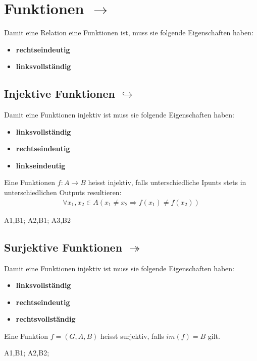 \section{Funktionen $\rightarrow$}
Damit eine Relation eine Funktionen ist, muss sie folgende Eigenschaften haben:
\begin{itemize}
    \item \textbf{rechtseindeutig}
    \item \textbf{linksvollständig}
\end{itemize}
\subsection{Injektive Funktionen $\hookrightarrow$}
Damit eine Funktionen injektiv ist muss sie folgende Eigenschaften haben:
\begin{itemize}
    \item \textbf{linksvollständig}
    \item \textbf{rechtseindeutig}
    \item \textbf{linkseindeutig}
\end{itemize}
Eine Funktionen $f : A \rightarrow B$ heisst injektiv, falls unterschiedliche Ipunts stets in
unterschiedlichen Outputs resultieren:
\begin{align*}
    \forall{x_1, x_2} \in A(x_1 \neq x_2 \Rightarrow f(x_1) \neq f(x_2))
\end{align*}
\begin{center}
        {
        A1,B1;
        A2,B1;
        A3,B2
        }
    \injektiv{}
\end{center}
\subsection{Surjektive Funktionen $\twoheadrightarrow$}
Damit eine Funktionen injektiv ist muss sie folgende Eigenschaften haben:
\begin{itemize}
    \item \textbf{linksvollständig}
    \item \textbf{rechtseindeutig}
    \item \textbf{rechtsvollständig}
\end{itemize}
Eine Funktion $f = (G,A,B)$ heisst surjektiv, falls $im(f) = B$ gilt.
\begin{center}
        {
        A1,B1;
        A2,B2;
        }
    \surjektiv{}
\end{center}
